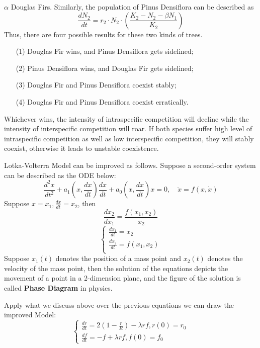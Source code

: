\documentclass{mcmthesis}
\numberwithin{figure}{section}
\numberwithin{table}{section}
\numberwithin{equation}{section}
\begin{document}
 $ \alpha $ Douglas Firs.
 Similarly, the population of Pinus Densiflora can be described as $$
 \frac{dN_2}{dt} = r_2\cdot N_2\cdot (\frac{K_2-N_2-\beta N_1}{K_2})
 $$ 
Thus, there are four possible results for these two kinds of trees.
\begin{enumerate}
  \item [(1)] Douglas Fir wins, and Pinus Densiflora gets sidelined;
  \item [(2)] Pinus Densiflora wins, and Douglas Fir gets sidelined;
  \item [(3)] Douglas Fir and Pinus Densiflora coexist stably;
  \item [(4)] Douglas Fir and Pinus Densiflora coexist erratically.
\end{enumerate}

Whichever wins, the intensity of intraspecific competition will decline while the
intensity of interspecific competition will roar. If both species suffer high level of
intraspecific competition as well as low interspecific competition, they will stably
coexist, otherwise it leads to unstable coexistence. 
\par
Lotka-Volterra Model can be improved as follows. Suppose a second-order system can be described as the ODE below:
$$
  \frac{d^2x}{dt^2}+a_1(x,\frac{dx}{dt})\frac{dx}{dt} + a_0(x,\frac{dx}{dt})x = 0, \quad \ddot{x} = f(x,\dot{x})
$$  
Suppose $ x = x_1, \frac{dx}{dt} = x_2 $, then
$$
  \frac{dx_2}{dx_1} = \frac{f(x_1,x_2)}{x_2}
$$ 
$$
\begin{cases}
        \frac{dx_1}{dt} = x_2\\
      \frac{dx_2}{dt} =f(x_1,x_2)\\
\end{cases}
$$ 
Suppose $ x_1(t) $ denotes the position of a mass point and $ x_2(t) $ denotes the velocity of the mass point, then the 
solution of the equations depicts the movement of a point in a 2-dimension plane, and the figure of the solution is called
\textbf{Phase Diagram} in physics.
\par
Apply what we discuss above over the previous equations we can draw the improved Model:
$$
  \begin{cases}
    \frac{dr}{dt} = 2(1-\frac{r}{R})-\lambda rf, r(0) = r_0\\
    \frac{df}{dt} = -f + \lambda rf, f(0) = f_0
  \end{cases}
$$ 
\end{document}
